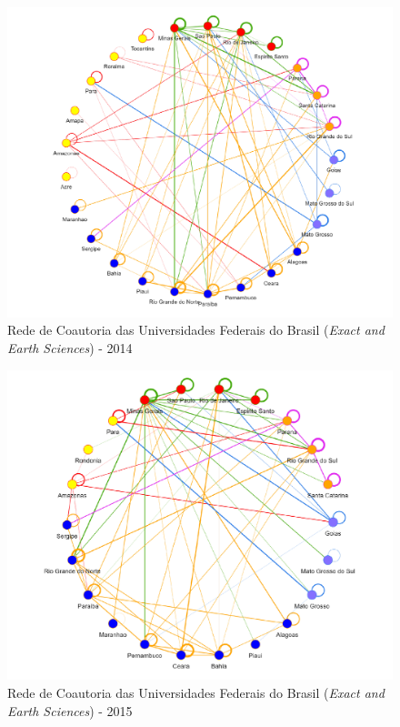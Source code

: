 \begin{figure}[H]
	\centering
	\includegraphics[width=\linewidth]{Imagens/rede-exact-br-2014.pdf}
	\caption{Rede de Coautoria das Universidades Federais do Brasil (\textit{Exact and Earth Sciences}) - 2014}
	\label{Rede de Coautoria - UF EXACT BR 2014}
\end{figure}


\begin{figure}[H]
	\centering
	\includegraphics[width=\linewidth]{Imagens/rede-exact-br-2015.pdf}
	\caption{Rede de Coautoria das Universidades Federais do Brasil (\textit{Exact and Earth Sciences}) - 2015}
	\label{Rede de Coautoria - UF EXACT BR 2015}
\end{figure}

